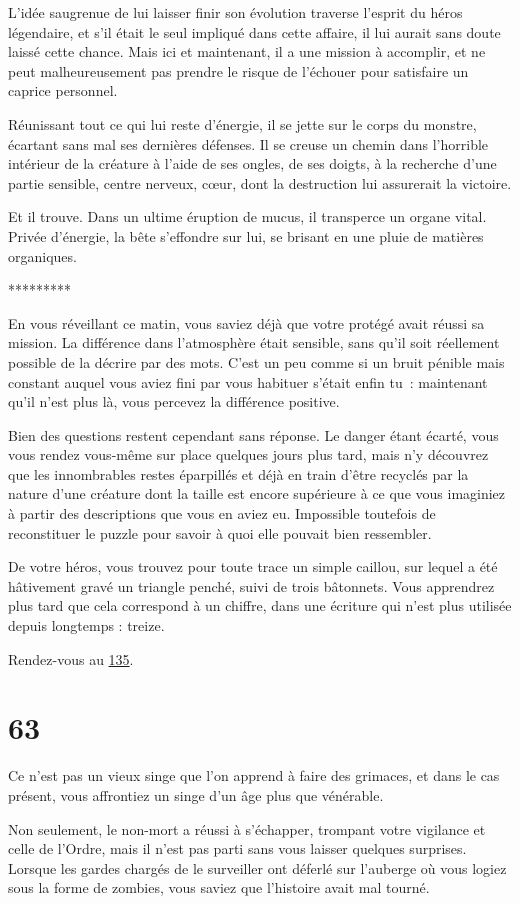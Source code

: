 \documentclass{report}
\newcommand{\gsection}[1]{
    \section{#1}
    \label{section-#1}
}
\newcommand{\glink}[1]{\hyperref[section-#1]{#1}}
\newcommand{\ellipse}{
    \begin{center}
        *********
    \end{center}
}
\begin{document}
L'idée saugrenue de lui laisser finir son évolution traverse l'esprit du héros légendaire, et s'il était le seul impliqué dans cette affaire, il lui aurait sans doute laissé cette chance. Mais ici et maintenant, il a une mission à accomplir, et ne peut malheureusement pas prendre le risque de l'échouer pour satisfaire un caprice personnel.

Réunissant tout ce qui lui reste d'énergie, il se jette sur le corps du monstre, écartant sans mal ses dernières défenses. Il se creuse un chemin dans l'horrible intérieur de la créature à l'aide de ses ongles, de ses doigts, à la recherche d'une partie sensible, centre nerveux, cœur, dont la destruction lui assurerait la victoire.

Et il trouve. Dans un ultime éruption de mucus, il transperce un organe vital. Privée d'énergie, la bête s'effondre sur lui, se brisant en une pluie de matières organiques.

\ellipse

En vous réveillant ce matin, vous saviez déjà que votre protégé avait réussi sa mission. La différence dans l'atmosphère était sensible, sans qu'il soit réellement possible de la décrire par des mots. C'est un peu comme si un bruit pénible mais constant auquel vous aviez fini par vous habituer s'était enfin tu : maintenant qu'il n'est plus là, vous percevez la différence positive.

Bien des questions restent cependant sans réponse. Le danger étant écarté, vous vous rendez vous-même sur place quelques jours plus tard, mais n'y découvrez que les innombrables restes éparpillés et déjà en train d'être recyclés par la nature d'une créature dont la taille est encore supérieure à ce que vous imaginiez à partir des descriptions que vous en aviez eu. Impossible toutefois de reconstituer le puzzle pour savoir à quoi elle pouvait bien ressembler.

De votre héros, vous trouvez pour toute trace un simple caillou, sur lequel a été hâtivement gravé un triangle penché, suivi de trois bâtonnets. Vous apprendrez plus tard que cela correspond à un chiffre, dans une écriture qui n'est plus utilisée depuis longtemps : treize.

Rendez-vous au \glink{135}.

\gsection{63}

Ce n'est pas un vieux singe que l'on apprend à faire des grimaces, et dans le cas présent, vous affrontiez un singe d'un âge plus que vénérable.

Non seulement, le non-mort a réussi à s'échapper, trompant votre vigilance et celle de l'Ordre, mais il n'est pas parti sans vous laisser quelques surprises. Lorsque les gardes chargés de le surveiller ont déferlé sur l'auberge où vous logiez sous la forme de zombies, vous saviez que l'histoire avait mal tourné.
\end{document}

